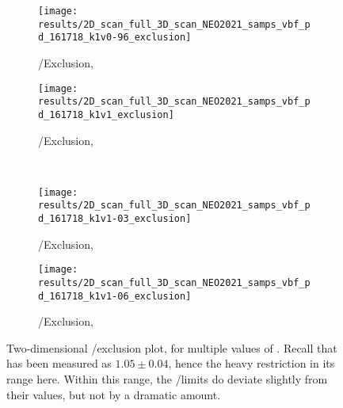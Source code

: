     \begin{figure}
        \centering
        \begin{subfigure}{0.48\textwidth} 
            \texttt{[image: results/2D\_scan\_full\_3D\_scan\_NEO2021\_samps\_vbf\_pd\_161718\_k1v0-96\_exclusion]}
            \caption{\kvv/\kl Exclusion, }
            \label{fig:kvv_kl_2Dscan_kv0.96}
        \end{subfigure}
        \begin{subfigure}{0.48\textwidth} 
            \texttt{[image: results/2D\_scan\_full\_3D\_scan\_NEO2021\_samps\_vbf\_pd\_161718\_k1v1\_exclusion]}
            \caption{\kvv/\kl Exclusion, }
            \label{fig:kvv_kl_2Dscan_kv1}
        \end{subfigure} \\
        \begin{subfigure}{0.48\textwidth}
            \texttt{[image: results/2D\_scan\_full\_3D\_scan\_NEO2021\_samps\_vbf\_pd\_161718\_k1v1-03\_exclusion]}
            \caption{\kvv/\kl Exclusion, }
            \label{fig:kvv_kl_2Dscan_kv1.03}
        \end{subfigure}
        \begin{subfigure}{0.48\textwidth}
            \texttt{[image: results/2D\_scan\_full\_3D\_scan\_NEO2021\_samps\_vbf\_pd\_161718\_k1v1-06\_exclusion]}
            \caption{\kvv/\kl Exclusion, }
            \label{fig:kvv_kl_2Dscan_kv1.06}
        \end{subfigure}
        \caption{Two-dimensional \kvv/\kl exclusion plot, for multiple values of \kv.
            Recall that \kv has been measured as $1.05 \pm 0.04$,
                hence the heavy restriction in its range here.
            Within this range, the \kvv/\kl limits do deviate slightly from their  values,
                but not by a dramatic amount.
        }\label{fig:kvv_kl_multislice}
    \end{figure}
